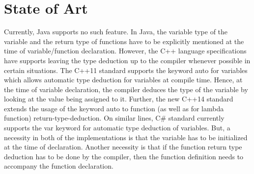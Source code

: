 \section{State of Art}
Currently, Java supports no such feature. In Java, the variable type of the variable and the return type of functions have to be explicitly mentioned at the time of variable/function declaration. However, the C++ language specifications have supports leaving the type deduction up to the compiler whenever possible in certain situations. The C++11 standard supports the keyword auto for variables which allows automatic type deduction for variables at compile time. Hence, at the time of variable declaration, the compiler deduces the type of the variable by looking at the value being assigned to it. Further, the new C++14 standard extends the usage of the keyword auto to function (as well as for lambda function) return-type-deduction. On similar lines, C\# standard currently supports the var keyword for automatic type deduction of variables. But, a necessity in both of the implementations is that the variable has to be initialized at the time of declaration. Another necessity is that if the function return type deduction has to be done by the compiler, then the function definition needs to accompany the function declaration.
